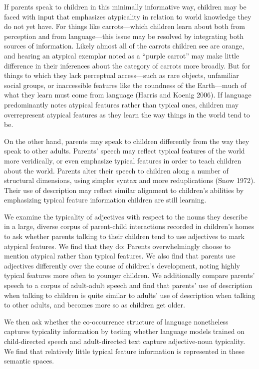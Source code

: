 \documentclass{ucetd}
\begin{document}
If parents speak to children in this minimally informative way, children
may be faced with input that emphasizes atypicality in relation to world
knowledge they do not yet have. For things like carrots---which children
learn about both from perception and from language---this issue may be
resolved by integrating both sources of information. Likely almost all
of the carrots children see are orange, and hearing an atypical exemplar
noted as a ``purple carrot'' may make little difference in their
inferences about the category of carrots more broadly. But for things to
which they lack perceptual access---such as rare objects, unfamiliar
social groups, or inaccessible features like the roundness of the
Earth---much of what they learn must come from language (Harris and
Koenig 2006). If language predominantly notes atypical features rather
than typical ones, children may overrepresent atypical features as they
learn the way things in the world tend to be.

On the other hand, parents may speak to children differently from the
way they speak to other adults. Parents' speech may reflect typical
features of the world more veridically, or even emphasize typical
features in order to teach children about the world. Parents alter their
speech to children along a number of structural dimensions, using
simpler syntax and more reduplications (Snow 1972). Their use of
description may reflect similar alignment to children's abilities by
emphasizing typical feature information children are still learning.

We examine the typicality of adjectives with respect to the nouns they
describe in a large, diverse corpus of parent-child interactions
recorded in children's homes to ask whether parents talking to their
children tend to use adjectives to mark atypical features. We find that
they do: Parents overwhelmingly choose to mention atypical rather than
typical features. We also find that parents use adjectives differently
over the course of children's development, noting highly typical
features more often to younger children. We additionally compare
parents' speech to a corpus of adult-adult speech and find that parents'
use of description when talking to children is quite similar to adults'
use of description when talking to other adults, and becomes more so as
children get older.

We then ask whether the co-occurrence structure of language nonetheless
captures typicality information by testing whether language models
trained on child-directed speech and adult-directed text capture
adjective-noun typicality. We find that relatively little typical
feature information is represented in these semantic spaces.
\end{document}
